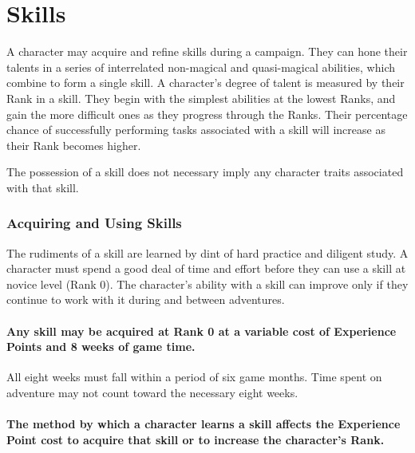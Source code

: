 \chapter{Skills}

\begin{multicols*}{3}
\label{skills}

A character may acquire and refine skills during a campaign.  They can
hone their talents in a series of interrelated non-magical and
quasi-magical abilities, which combine to form a single skill.  A
character's degree of talent is measured by their Rank in a skill.
They begin with the simplest abilities at the lowest Ranks, and gain
the more difficult ones as they progress through the Ranks.  Their
percentage chance of successfully performing tasks associated with a
skill will increase as their Rank becomes higher.

The possession of a skill does not necessary imply any character
traits associated with that skill.

\subsection{Acquiring and Using Skills}

The rudiments of a skill are learned by dint of hard practice and
diligent study.  A character must spend a good deal of time and effort
before they can use a skill at novice level (Rank 0). The character's
ability with a skill can improve only if they continue to work with it
during and between adventures.

\subsubsection{Any skill may be acquired at Rank 0 at a variable cost
of Experience Points and 8 weeks of game time.}

All eight weeks must fall within a period of six game months.  Time
spent on adventure may not count toward the necessary eight weeks.

\subsubsection{The method by which a character learns a skill affects the
Experience Point cost to acquire that skill or to increase the
character's Rank.}


\end{multicols*}
